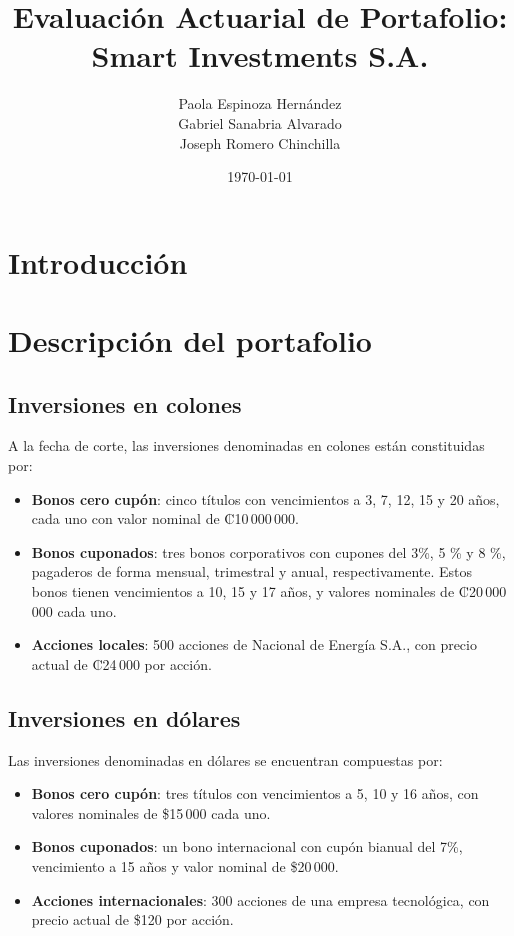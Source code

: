\documentclass[12pt, a4paper]{article}
\title{Evaluación Actuarial de Portafolio: Smart Investments S.A.}
\author{
Paola Espinoza Hernández\\
Gabriel Sanabria Alvarado\\
Joseph Romero Chinchilla
}
\date{\today}
\begin{document}
\maketitle

\tableofcontents
\newpage

\section{Introducción}

\section{Descripción del portafolio}

\subsection{Inversiones en colones}

A la fecha de corte, las inversiones denominadas en colones están constituidas por:

\begin{itemize}
  \item \textbf{Bonos cero cupón}: cinco títulos con vencimientos a 3, 7, 12, 15 y 20 años, cada uno con valor nominal de ₡10\,000\,000.
  \item \textbf{Bonos cuponados}: tres bonos corporativos con cupones del 3\%, 5 \% y 8 \%, pagaderos de forma mensual, trimestral y anual, respectivamente. Estos bonos tienen vencimientos a 10, 15 y 17 años, y valores nominales de ₡20\,000\,000 cada uno.
  \item \textbf{Acciones locales}: 500 acciones de Nacional de Energía S.A., con precio actual de ₡24\,000 por acción.
\end{itemize}

\subsection{Inversiones en dólares}

Las inversiones denominadas en dólares se encuentran compuestas por:

\begin{itemize}
  \item \textbf{Bonos cero cupón}: tres títulos con vencimientos a 5, 10 y 16 años, con valores nominales de \$15\,000 cada uno.
  \item \textbf{Bonos cuponados}: un bono internacional con cupón bianual del 7\%, vencimiento a 15 años y valor nominal de \$20\,000.
  \item \textbf{Acciones internacionales}: 300 acciones de una empresa tecnológica, con precio actual de \$120 por acción.
\end{itemize}
\end{document}
